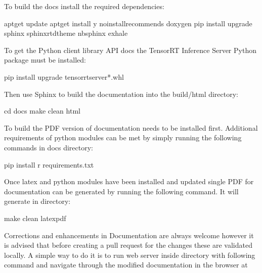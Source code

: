 \documentclass[letterpaper,10pt,english]{sphinxmanual}
\begin{document}
To build the docs install the required dependencies:

\begin{sphinxVerbatim}[commandchars=\\\{\}]
\PYGZdl{} apt\PYGZhy{}get update
\PYGZdl{} apt\PYGZhy{}get install \PYGZhy{}y \PYGZhy{}\PYGZhy{}no\PYGZhy{}install\PYGZhy{}recommends doxygen
\PYGZdl{} pip install \PYGZhy{}\PYGZhy{}upgrade sphinx sphinx\PYGZhy{}rtd\PYGZhy{}theme nbsphinx exhale
\end{sphinxVerbatim}

To get the Python client library API docs the TensorRT Inference
Server Python package must be installed:

\begin{sphinxVerbatim}[commandchars=\\\{\}]
\PYGZdl{} pip install \PYGZhy{}\PYGZhy{}upgrade tensorrtserver\PYGZhy{}*.whl
\end{sphinxVerbatim}

Then use Sphinx to build the documentation into the build/html
directory:

\begin{sphinxVerbatim}[commandchars=\\\{\}]
\PYGZdl{} cd docs
\PYGZdl{} make clean html
\end{sphinxVerbatim}

To build the PDF version of documentation 
needs to be installed first. Additional requirements of python modules
can be met by simply running the following commands in docs directory:

\begin{sphinxVerbatim}[commandchars=\\\{\}]
\PYGZdl{} pip install \PYGZhy{}r requirements.txt
\end{sphinxVerbatim}

Once latex and python modules have been installed and updated single PDF for documentation
can be generated by running the following command. It will generate  in 
directory:

\begin{sphinxVerbatim}[commandchars=\\\{\}]
\PYGZdl{}make clean latexpdf
\end{sphinxVerbatim}

Corrections and enhancements in Documentation are always welcome however it is advised that before
creating a pull request for the changes these are validated locally. A simple way to do it is to run web server
inside  directory with following command and navigate through the modified documentation in the browser
at 
\end{document}
